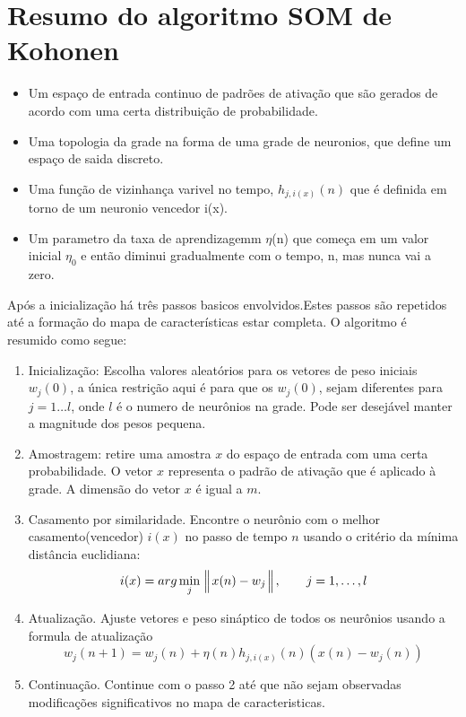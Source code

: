 \section {Resumo do algoritmo SOM de Kohonen}
\begin {itemize}
\item Um espaço de entrada continuo de padrões de ativação que são gerados de acordo com uma certa distribuição de probabilidade.
\item Uma topologia da grade na forma de uma grade de neuronios, que define um espaço de saida discreto.
\item Uma função de vizinhança varivel no tempo, $\displaystyle h _{j,i(x)}(n)$ que é definida em torno de um neuronio vencedor i(x).
\item Um parametro da taxa de aprendizagemm $\eta$(n) que começa em um valor inicial $\eta _0$ e então diminui gradualmente com o  tempo, n, mas nunca vai a zero.
\end{itemize}
	Após a inicialização há três passos basicos envolvidos.Estes passos são repetidos até a formação do mapa de características estar completa. O algoritmo é resumido como segue: 
\begin {enumerate}
\item Inicialização: Escolha valores aleatórios  para os vetores de peso iniciais $w_j(0)$, a única restrição aqui é para que os $w _j(0)$, sejam diferentes para $j= 1 \ldots l $, onde $l$ é o numero de neurônios na grade. Pode ser desejável manter a magnitude dos pesos pequena.
\item Amostragem: retire uma amostra $x$ do espaço de entrada com uma certa probabilidade. O vetor $x$ representa o padrão de ativação que é aplicado à grade. A dimensão do vetor $x$ é igual a $m$.
\item  Casamento por similaridade. Encontre o neurônio com o melhor casamento(vencedor) $i(x)$ no passo de tempo $n$ usando o critério da mínima distância euclidiana: $$
\displaystyle  i(x) = arg\min\limits_{j}\Big \Arrowvert x(n) - w_j\Big \Arrowvert, \qquad j = 1,\ldots, l
$$
\item Atualização. Ajuste vetores e peso sináptico de todos os neurônios usando a formula de atualização $$
\displaystyle  w_j(n+1) = w_j(n)+ \eta(n)h_{j,i(x)} (n)(x(n) - w_j(n) )
$$
\item  Continuação. Continue com o passo 2 até que não sejam observadas modificações significativos no mapa de caracteristicas.
\end{enumerate}
